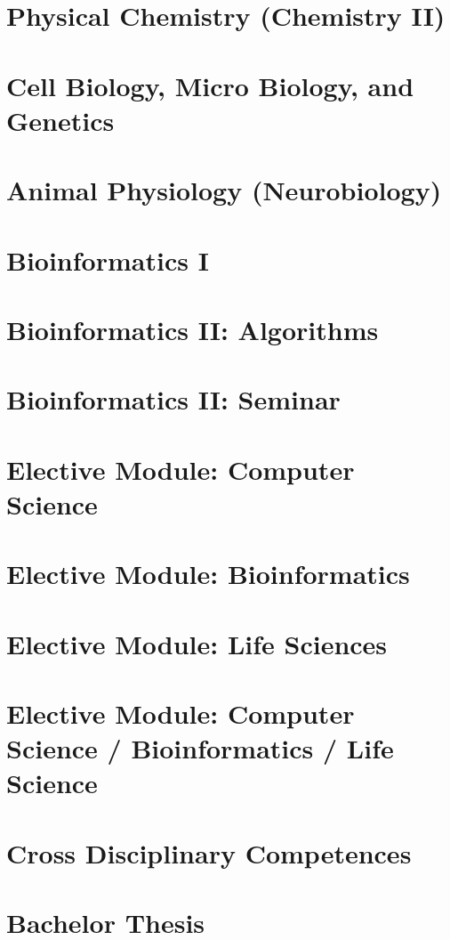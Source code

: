 \chapter{Physical Chemistry (Chemistry II)}


\chapter{Cell Biology, Micro Biology, and Genetics}


\chapter{Animal Physiology (Neurobiology)}


\chapter{Bioinformatics I}


\chapter{Bioinformatics II: Algorithms}


\chapter{Bioinformatics II: Seminar}


\chapter{Elective Module: Computer Science}


\chapter{Elective Module: Bioinformatics}


\chapter{Elective Module: Life Sciences}


\chapter{Elective Module: Computer Science / Bioinformatics / Life Science}


\chapter{Cross Disciplinary Competences}


\chapter{Bachelor Thesis}
